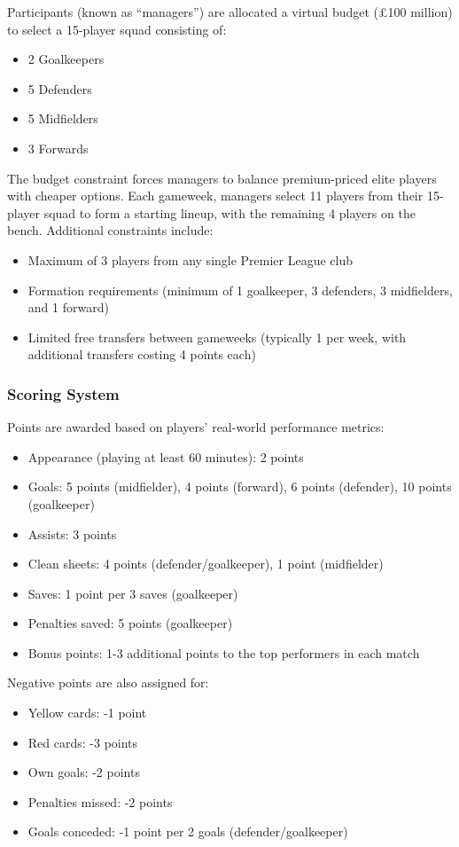 Participants (known as ``managers'') are allocated a virtual budget (£100 million) to select a 15-player squad consisting of:
\begin{itemize}
    \item 2 Goalkeepers
    \item 5 Defenders
    \item 5 Midfielders
    \item 3 Forwards
\end{itemize}

The budget constraint forces managers to balance premium-priced elite players with cheaper options. Each gameweek, managers select 11 players from their 15-player squad to form a starting lineup, with the remaining 4 players on the bench. Additional constraints include:
\begin{itemize}
    \item Maximum of 3 players from any single Premier League club
    \item Formation requirements (minimum of 1 goalkeeper, 3 defenders, 3 midfielders, and 1 forward)
    \item Limited free transfers between gameweeks (typically 1 per week, with additional transfers costing 4 points each) \cite{fpl2024rules}
\end{itemize}

\subsubsection{Scoring System} \label{ch:scoring_guide}

Points are awarded based on players' real-world performance metrics:
\begin{itemize}
    \item Appearance (playing at least 60 minutes): 2 points
    \item Goals: 5 points (midfielder), 4 points (forward), 6 points (defender), 10 points (goalkeeper)
    \item Assists: 3 points
    \item Clean sheets: 4 points (defender/goalkeeper), 1 point (midfielder)
    \item Saves: 1 point per 3 saves (goalkeeper)
    \item Penalties saved: 5 points (goalkeeper)
    \item Bonus points: 1-3 additional points to the top performers in each match
\end{itemize}

Negative points are also assigned for:
\begin{itemize}
    \item Yellow cards: -1 point
    \item Red cards: -3 points
    \item Own goals: -2 points
    \item Penalties missed: -2 points
    \item Goals conceded: -1 point per 2 goals (defender/goalkeeper) \cite{fpl2024rules}
\end{itemize}

